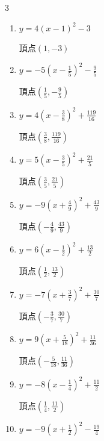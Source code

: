 \begin{multicols}{3}
\begin{enumerate}
        $\displaystyle 頂点\left( \frac{3}{4} , -\frac{1}{8} \right)$

  \item $\displaystyle y=4\left( x-1\right)^{2}-3$

        $\displaystyle 頂点\left( 1 , -3 \right)$

  \item $\displaystyle y=-5\left( x-\frac{1}{5}\right)^{2}-\frac{9}{5}$

        $\displaystyle 頂点\left( \frac{1}{5} , -\frac{9}{5} \right)$

  \item $\displaystyle y=4\left( x-\frac{3}{8}\right)^{2}+\frac{119}{16}$

        $\displaystyle 頂点\left( \frac{3}{8} , \frac{119}{16} \right)$

  \item $\displaystyle y=5\left( x-\frac{3}{5}\right)^{2}+\frac{21}{5}$

        $\displaystyle 頂点\left( \frac{3}{5} , \frac{21}{5} \right)$

  \item $\displaystyle y=-9\left( x+\frac{4}{9}\right)^{2}+\frac{43}{9}$

        $\displaystyle 頂点\left( -\frac{4}{9} , \frac{43}{9} \right)$

  \item $\displaystyle y=6\left( x-\frac{1}{2}\right)^{2}+\frac{13}{2}$

        $\displaystyle 頂点\left( \frac{1}{2} , \frac{13}{2} \right)$

\columnbreak %

\resetques

  \item $\displaystyle y=-7\left( x+\frac{3}{7}\right)^{2}+\frac{30}{7}$

        $\displaystyle 頂点\left( -\frac{3}{7} , \frac{30}{7} \right)$

  \item $\displaystyle y=9\left( x+\frac{5}{18}\right)^{2}+\frac{11}{36}$

        $\displaystyle 頂点\left( -\frac{5}{18} , \frac{11}{36} \right)$

  \item $\displaystyle y=-8\left( x-\frac{1}{4}\right)^{2}+\frac{11}{2}$

        $\displaystyle 頂点\left( \frac{1}{4} , \frac{11}{2} \right)$

  \item $\displaystyle y=-9\left( x+\frac{1}{2}\right)^{2}-\frac{19}{4}$


\end{enumerate}
\end{multicols}
